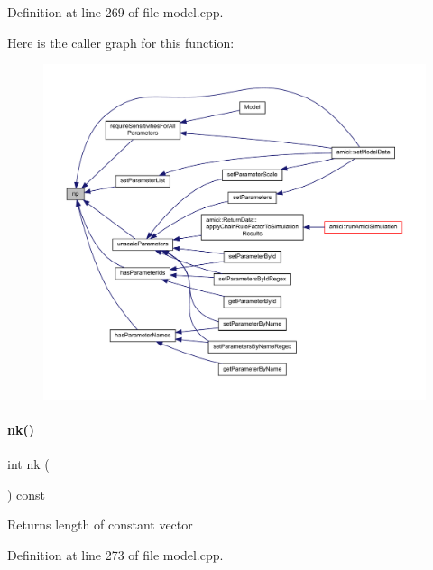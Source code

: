 Definition at line 269 of file model.\+cpp.

Here is the caller graph for this function\+:
\nopagebreak
\begin{figure}[H]
\begin{center}
\leavevmode
\includegraphics[width=350pt]{classamici_1_1_model_ae296546c9fd4d7c4ad3b7000aa9e22ef_icgraph}
\end{center}
\end{figure}
\mbox{\label{classamici_1_1_model_a3d4130da64883565a06a86e7d6029da1}} 
\paragraph{\texorpdfstring{nk()}{nk()}}
{\footnotesize\ttfamily int nk (\begin{DoxyParamCaption}{ }\end{DoxyParamCaption}) const}

\begin{DoxyReturn}{Returns}
length of constant vector 
\end{DoxyReturn}


Definition at line 273 of file model.\+cpp.

